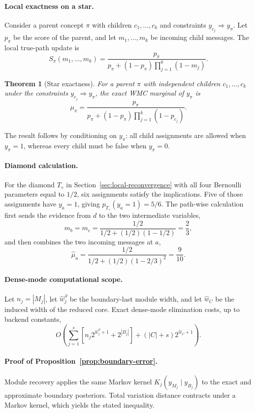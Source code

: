 \documentclass[letterpaper]{article}
\newtheorem{theorem}{Theorem}
\begin{document}
\paragraph{Local exactness on a star.}
Consider a parent concept \(\pi\) with children \(c_1,\ldots,c_k\) and
constraints \(y_{c_j}\Rightarrow y_\pi\). Let \(p_\pi\) be the score of
the parent, and let \(m_1,\ldots,m_k\) be incoming child messages. The
local true-path update is
\[
S_\pi(m_1,\ldots,m_k)
=
\frac{p_\pi}
     {p_\pi+(1-p_\pi)\prod_{j=1}^{k}(1-m_j)}.
\]

\begin{theorem}[Star exactness]
\label{thm:star}
For a parent \(\pi\) with independent children
\(c_1,\ldots,c_k\) under the constraints
\(y_{c_j}\Rightarrow y_\pi\), the exact WMC marginal of \(y_\pi\) is
\[
\mu_\pi
=
\frac{p_\pi}
     {p_\pi+(1-p_\pi)\prod_{j=1}^{k}(1-p_{c_j})}.
\]
\end{theorem}

The result follows by conditioning on \(y_\pi\): all child assignments
are allowed when \(y_\pi=1\), whereas every child must be false when
\(y_\pi=0\).

\paragraph{Diamond calculation.}
\label{app:diamond-calculation}
For the diamond \(T_{\diamond}\) in Section~\ref{sec:local-reconvergence}
with all four Bernoulli parameters equal to \(1/2\), six assignments
satisfy the implications. Five of those assignments have \(y_a=1\), giving
\(p_{T_{\diamond}}(y_a=1)=5/6\). The path-wise calculation first sends
the evidence from \(d\) to the two intermediate variables,
\[
m_b=m_c
=
\frac{1/2}{1/2+(1/2)(1-1/2)}
=
\frac{2}{3},
\]
and then combines the two incoming messages at \(a\),
\[
\widehat{\mu}_a
=
\frac{1/2}{1/2+(1/2)(1-2/3)^2}
=
\frac{9}{10}.
\]

\paragraph{Dense-mode computational scope.}
\label{app:dense-cost}
Let \(n_j=|M_j|\), let \(\widehat w_j^\partial\) be the boundary-last
module width, and let \(\widehat w_C\) be the induced width of the reduced
core. Exact dense-mode elimination costs, up to backend constants,
\[
O\!\left(
\sum_{j=1}^{s}\!\left[n_j2^{\widehat w_j^\partial+1}+2^{|B_j|}\right]
+
(|C|+s)2^{\widehat w_C+1}
\right).
\]

\paragraph{Proof of Proposition~\ref{prop:boundary-error}.}
\label{app:boundary-error-proof}
Module recovery applies the same Markov kernel
\(K_j(y_{M_j}\mid y_{B_j})\) to the exact and approximate boundary
posteriors. Total variation distance contracts under a Markov kernel,
which yields the stated inequality.
\end{document}

